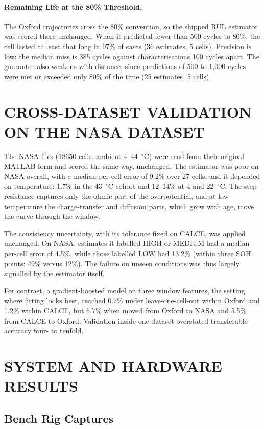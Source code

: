 \documentclass[12pt,a4paper]{amritareport}
\begin{document}
\paragraph{Remaining Life at the 80\% Threshold.} The Oxford trajectories cross the 80\% convention, so the shipped RUL estimator was scored there unchanged. When it predicted fewer than 500 cycles to 80\%, the cell lasted at least that long in 97\% of cases (36 estimates, 5 cells). Precision is low: the median miss is 385 cycles against characterisations 100 cycles apart. The guarantee also weakens with distance, since predictions of 500 to 1,000 cycles were met or exceeded only 80\% of the time (25 estimates, 5 cells).

\section{CROSS-DATASET VALIDATION ON THE NASA DATASET}
\label{sec:res-xds}

The NASA files (18650 cells, ambient 4--44~$^\circ$C) were read from their original MATLAB form and scored the same way, unchanged. The estimator was poor on NASA overall, with a median per-cell error of 9.2\% over 27 cells, and it depended on temperature: 1.7\% in the 43~$^\circ$C cohort and 12--14\% at 4 and 22~$^\circ$C. The step resistance captures only the ohmic part of the overpotential, and at low temperature the charge-transfer and diffusion parts, which grow with age, move the curve through the window.

The consistency uncertainty, with its tolerance fixed on CALCE, was applied unchanged. On NASA, estimates it labelled HIGH or MEDIUM had a median per-cell error of 4.5\%, while those labelled LOW had 13.2\% (within three SOH points: 49\% versus 12\%). The failure on unseen conditions was thus largely signalled by the estimator itself.

For contrast, a gradient-boosted model on three window features, the setting where fitting looks best, reached 0.7\% under leave-one-cell-out within Oxford and 1.2\% within CALCE, but 6.7\% when moved from Oxford to NASA and 5.5\% from CALCE to Oxford. Validation inside one dataset overstated transferable accuracy four- to tenfold.

\section{SYSTEM AND HARDWARE RESULTS}
\label{sec:res-system}

\subsection{Bench Rig Captures}
\end{document}
